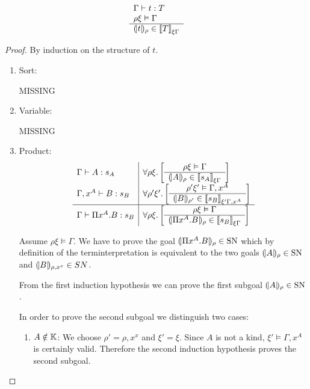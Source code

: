 \begin{theorem}
    $$
    \begin{array}{l} 
        \Gamma \vdash t : T
        \\
        \rho\xi \vDash \Gamma
     \\ \hline 
        {(\!|t|\!)_{\rho}} \in {{[\![}T{]\!]}}_{\xi\Gamma}
    \end{array}
    $$
    \def\goal#1#2#3#4#5{
        \forall #1 #2.
        \left[
        \ruleh{
            #1#2 \vDash #3
        }
        {
            \terminter{#4}{#1} \in \typeinter{#5}{#2#3}
        }
        \right]
    }

    \begin{proof}
        By induction on the structure of $t$.

        \begin{enumerate}
        \item Sort:

            MISSING
        \item Variable:

            MISSING
        \item Product:
            $$
            \begin{array}{l|l}
                \Gamma \vdash A : s_A
                &\goal \rho \xi \Gamma A {s_A}
                \\
                \Gamma, x^A \vdash B: s_B
                & \goal {\rho'} {\xi'} {\Gamma,x^A} B {s_B}
                \\
                \hline
                \Gamma \vdash \Pi x^A. B : s_B
                &
                \goal \rho \xi \Gamma {\Pi x^A.B} {s_B}
            \end{array}
            $$

            Assume $\rho\xi \vDash \Gamma$. We have to prove the goal
                ${(\!|\Pi x^A.B|\!)_{\rho}} \in \text{SN}$ which by definition of the
                terminterpretation is equivalent to the two goals
                ${(\!|A|\!)_{\rho}} \in \text{SN}$
                and ${(\!|B|\!)_{\rho,x^x}} \in SN$.

            From the first induction hypothesis we can prove
            the first subgoal ${(\!|A|\!)_{\rho}} \in \text{SN}$.

            In order to prove the second subgoal we distinguish two cases:
            \begin{enumerate}
            \item $A \notin \mathbb{K}$:
                We choose $\rho' = \rho,x^x$ and $\xi' = \xi$.
                Since $A$ is not a kind, $\xi' \vDash \Gamma,x^A$ is
                certainly valid. Therefore the second induction hypothesis
                    proves the second subgoal.


\end{enumerate}
\end{enumerate}
\end{proof}
\end{theorem}

